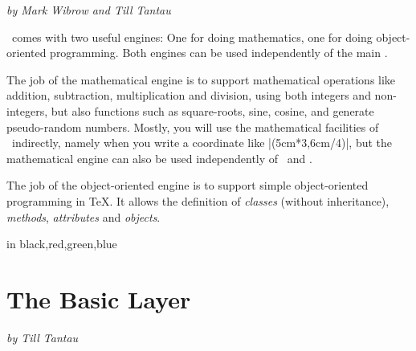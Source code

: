 {\Large \emph{by Mark Wibrow and Till Tantau}}


\bigskip
\noindent
\pgfname\ comes with two useful engines: One for doing mathematics, one for
doing object-oriented programming. Both engines can be used independently of
the main \pgfname.

The job of the mathematical engine is to support mathematical operations like
addition, subtraction, multiplication and division, using both integers and
non-integers, but also functions such as square-roots, sine, cosine, and
generate pseudo-random numbers. Mostly, you will use the mathematical
facilities of \pgfname\ indirectly, namely when you write a coordinate like
|(5cm*3,6cm/4)|, but the mathematical engine can also be used independently of
\pgfname\ and \tikzname.

The job of the object-oriented engine is to support simple object-oriented
programming in \TeX. It allows the definition of \emph{classes} (without
inheritance), \emph{methods}, \emph{attributes} and \emph{objects}.

\vskip1cm
\begin{codeexample}[graphic=white]
\foreach \col in {black,red,green,blue}
{
}
\end{codeexample}











\part{The Basic Layer}

{\Large \emph{by Till Tantau}}


